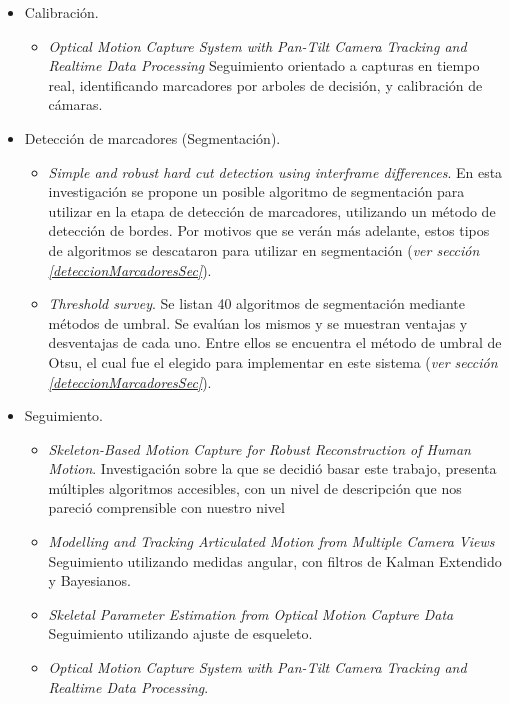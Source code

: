 \begin{itemize}
	\item Calibración.
	\begin{itemize}
		\item \emph{Optical Motion Capture System with Pan-Tilt Camera Tracking and Realtime Data Processing}\cite{kurihara2002optical} Seguimiento orientado a capturas en tiempo real, identificando marcadores por arboles de decisión, y calibración de cámaras.
	\end{itemize}
	\item Detección de marcadores (Segmentación).
	\begin{itemize}
		\item \emph{Simple and robust hard cut detection using interframe differences}\cite{pardo2005simple}. En esta investigación se propone un posible algoritmo de segmentación para utilizar en la etapa de detección de marcadores, utilizando un método de detección de bordes. Por motivos que se verán más adelante, estos tipos de algoritmos se descataron para utilizar en segmentación (\textit{ver sección \ref{deteccionMarcadoresSec}}).
		\item \emph{Threshold survey}\cite{surveyThreshold}. Se listan 40 algoritmos de segmentación mediante métodos de umbral. Se evalúan los mismos y se muestran ventajas y desventajas de cada uno. Entre ellos se encuentra el método de umbral de Otsu\cite{otsu}, el cual fue el elegido para implementar en este sistema (\textit{ver sección \ref{deteccionMarcadoresSec}}).
	\end{itemize}
	\item Seguimiento.
	\begin{itemize}
		\item \emph{Skeleton-Based Motion Capture for Robust Reconstruction of Human Motion}\cite{herda}. Investigación sobre la que se decidió basar este trabajo, presenta múltiples algoritmos accesibles, con un nivel de descripción que nos pareció comprensible con nuestro nivel
		\item \emph{Modelling and Tracking Articulated Motion from Multiple Camera Views}\cite{ringer2000modelling} Seguimiento utilizando medidas angular, con filtros de Kalman Extendido y Bayesianos.
		\item \emph{Skeletal Parameter Estimation from Optical Motion Capture Data}\cite{kirk2005skeletal} Seguimiento utilizando ajuste de esqueleto.
		\item \emph{Optical Motion Capture System with Pan-Tilt Camera Tracking and  Realtime Data Processing}\cite{kurihara2002optical}.

\end{itemize}
\end{itemize}
